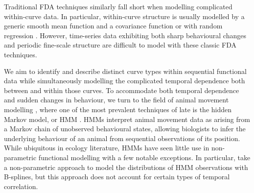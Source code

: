 Traditional FDA techniques similarly fall short when modelling complicated within-curve %
data. In particular, within-curve structure is usually modelled by a generic smooth mean function and a covariance function \citep{Yao:2005} 
or with random regression \citep{Rice:2001}. 
However, time-series data exhibiting both sharp behavioural changes and periodic fine-scale structure are difficult to model with these classic FDA techniques.

We aim to identify and describe distinct curve types within sequential functional data while simultaneously modelling the complicated temporal dependence both between and within those curves. To accommodate both temporal dependence and sudden changes in behaviour, we turn to the field of
animal movement modelling \citep{Hooten:2017}, where one of the most prevalent techniques of late is the hidden Markov model, or HMM \citep{Patterson:2017,McClintock:2020}. HMMs interpret animal movement data as arising from a Markov chain of unobserved behavioural states, allowing biologists to infer the underlying behaviour of an animal from sequential observations of its position. While ubiquitous in ecology literature, HMMs have seen little use in non-parametric functional modelling with a few notable exceptions. In particular, \citet{Langrock:2018} take a non-parametric approach to model the distributions of HMM observations with B-splines, 
but this approach does not account for certain types of temporal correlation.

